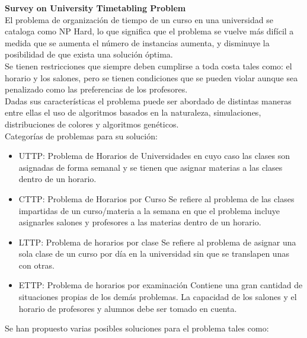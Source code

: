 \label{sec:introduccion}

\textbf{Survey on University Timetabling Problem} \\

El problema de organización de tiempo de un curso en una universidad se cataloga como NP Hard, lo que significa que el problema se vuelve más difícil a medida que se aumenta el número de instancias aumenta, y disminuye la posibilidad de que exista una solución óptima. \\

Se tienen restricciones que siempre deben cumplirse a toda costa tales como: el horario y los salones, pero se tienen condiciones que se pueden violar aunque sea penalizado como las preferencias de los profesores. \\ 

Dadas sus características el problema puede ser abordado de distintas maneras entre ellas el uso de algoritmos basados en la naturaleza, simulaciones, distribuciones de colores y algoritmos genéticos. \\

Categorías de problemas para su solución:
	
	\begin{itemize}
		\item UTTP: Problema de Horarios de Universidades
		en cuyo caso las clases son asignadas de forma semanal y se tienen que asignar materias a las clases dentro de un horario.
		
		\item CTTP: Problema de Horarios por Curso
		Se refiere al problema de las clases impartidas de un curso/materia a la semana en que el problema incluye asignarles salones y profesores a las materias dentro de un horario.
		
		\item LTTP: Problema de horarios por clase
		Se refiere al problema de asignar una sola clase de un curso por día en la universidad sin que se translapen unas con otras.
		
		\item ETTP: Problema de horarios por examinación
		Contiene una gran cantidad de situaciones propias de los demás problemas. La capacidad de los salones y el horario de profesores y alumnos debe ser tomado en cuenta.
	\end{itemize}
	
	Se han propuesto varias posibles soluciones para el problema tales como:
	
